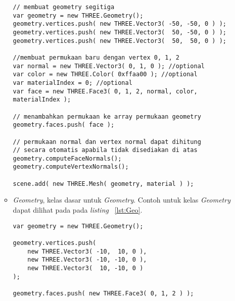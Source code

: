 \begin{itemize}
\begin{itemize}
\begin{lstlisting}[caption={Contoh penggunaan {\it Face3} pada suatu {\it Geometry}.}, label={lst:face3},captionpos=b]
// membuat geometry segitiga
var geometry = new THREE.Geometry();
geometry.vertices.push( new THREE.Vector3( -50, -50, 0 ) );
geometry.vertices.push( new THREE.Vector3(  50, -50, 0 ) );
geometry.vertices.push( new THREE.Vector3(  50,  50, 0 ) );

//membuat permukaan baru dengan vertex 0, 1, 2
var normal = new THREE.Vector3( 0, 1, 0 ); //optional
var color = new THREE.Color( 0xffaa00 ); //optional
var materialIndex = 0; //optional
var face = new THREE.Face3( 0, 1, 2, normal, color, materialIndex );

// menambahkan permukaan ke array permukaan geometry
geometry.faces.push( face );

// permukaan normal dan vertex normal dapat dihitung
// secara otomatis apabila tidak disediakan di atas
geometry.computeFaceNormals();
geometry.computeVertexNormals();

scene.add( new THREE.Mesh( geometry, material ) );
\end{lstlisting}
		\item{\it Geometry}, kelas dasar untuk {\it Geometry}. Contoh untuk kelas {\it Geometry} dapat dilihat pada pada {\it listing} ~\ref{lst:Geo}.
\begin{lstlisting}[caption={Contoh instansiasi kelas {\it Geometry}.}, label={lst:Geo},captionpos=b]
var geometry = new THREE.Geometry();

geometry.vertices.push(
	new THREE.Vector3( -10,  10, 0 ),
	new THREE.Vector3( -10, -10, 0 ),
	new THREE.Vector3(  10, -10, 0 )
);

geometry.faces.push( new THREE.Face3( 0, 1, 2 ) );


\end{lstlisting}
\end{itemize}
\end{itemize}
